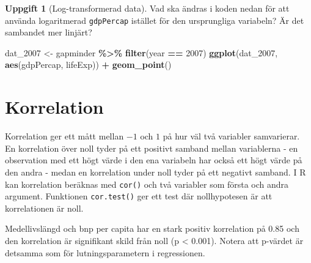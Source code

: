 \documentclass[
]{book}
\newenvironment{Shaded}{\begin{snugshade}}{\end{snugshade}}
\newcommand{\DecValTok}[1]{\textcolor[rgb]{0.00,0.00,0.81}{#1}}
\newcommand{\FunctionTok}[1]{\textcolor[rgb]{0.13,0.29,0.53}{\textbf{#1}}}
\newcommand{\NormalTok}[1]{#1}
\newcommand{\OtherTok}[1]{\textcolor[rgb]{0.56,0.35,0.01}{#1}}
\newcommand{\SpecialCharTok}[1]{\textcolor[rgb]{0.81,0.36,0.00}{\textbf{#1}}}
\theoremstyle{definition}
\theoremstyle{definition}
\theoremstyle{definition}
\newtheorem{exercise}{Uppgift}[chapter]
\theoremstyle{definition}
\theoremstyle{remark}
\begin{document}
\begin{exercise}[Log-transformerad data]

Vad ska ändras i koden nedan för att använda logaritmerad \texttt{gdpPercap} istället för den ursprungliga variabeln? Är det sambandet mer linjärt?

\begin{Shaded}
\begin{Highlighting}[]
\NormalTok{dat\_2007 }\OtherTok{\textless{}{-}}\NormalTok{ gapminder }\SpecialCharTok{\%\textgreater{}\%} \FunctionTok{filter}\NormalTok{(year }\SpecialCharTok{==} \DecValTok{2007}\NormalTok{)}
\FunctionTok{ggplot}\NormalTok{(dat\_2007, }\FunctionTok{aes}\NormalTok{(gdpPercap, lifeExp)) }\SpecialCharTok{+} \FunctionTok{geom\_point}\NormalTok{()}
\end{Highlighting}
\end{Shaded}

\end{exercise}

\section{Korrelation}\label{korrelation}

Korrelation ger ett mått mellan \(-1\) och \(1\) på hur väl två variabler samvarierar. En korrelation över noll tyder på ett positivt samband mellan variablerna - en observation med ett högt värde i den ena variabeln har också ett högt värde på den andra - medan en korrelation under noll tyder på ett negativt samband. I R kan korrelation beräknas med \texttt{cor()} och två variabler som första och andra argument. Funktionen \texttt{cor.test()} ger ett test där nollhypotesen är att korrelationen är noll.

\begin{Shaded}
\end{Shaded}

Medellivslängd och bnp per capita har en stark positiv korrelation på 0.85 och den korrelation är signifikant skild från noll (p \textless{} 0.001). Notera att p-värdet är detsamma som för lutningsparametern i regressionen.
\end{document}
